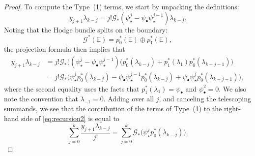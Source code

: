 \documentclass[12pt]{amsart}
\theoremstyle{definition}
\newcommand{\bE}{\mathbb{E}}
\newcommand{\G}{\mathcal{G}}
\numberwithin{equation}{section}
\begin{document}
\begin{proof}
To compute the Type~(1) terms, we start by unpacking the definitions:
\[
y_{j+1}\lambda_{k-j}=j!\G_*(\psi_\star^j-\psi_\bullet\psi_\star^{j-1})\lambda_{k-j}.
\]
Noting that the Hodge bundle splits on the boundary:
\[
\G^*(\bE)=p_0^*(\bE)\oplus p_1^*(\bE),
\]
the projection formula then implies that
\begin{align*}
y_{j+1}\lambda_{k-j}&=j!\G_*\big((\psi_\star^j-\psi_\bullet\psi_\star^{j-1})(p_0^*(\lambda_{k-j})+p_1^*(\lambda_1)p_0^*(\lambda_{k-j-1})\big)\\
&=j!\G_*\big(\psi_\star^jp_0^*(\lambda_{k-j})-\psi_\bullet\psi_\star^{j-1}p_0^*(\lambda_{k-j})+\psi_\bullet\psi_\star^jp_0^*(\lambda_{k-j-1})\big),
\end{align*}
where the second equality uses the facts that $p_1^*(\lambda_1)=\psi_\bullet$ and $\psi_\bullet^2=0$. We also note the convention that $\lambda_{-1}=0$. Adding over all $j$, and canceling the telescoping summands, we see that the contribution of the terms of Type~(1) to the right-hand side of \eqref{eq:recursion2} is equal to
\begin{equation}\label{eq:recursiontype1}
\sum_{j=0}^k\frac{y_{j+1}\lambda_{k-j}}{j!}=\sum_{j=0}^k\G_*\big(\psi_\star^jp_0^*(\lambda_{k-j})\big).
\end{equation}


\end{proof}
\end{document}
